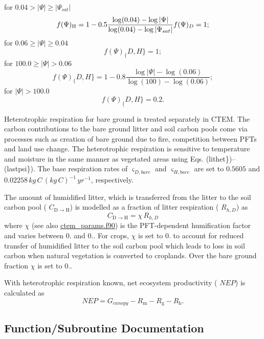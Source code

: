 for $0.04 > \vert\Psi\vert \geq \vert\Psi_{sat}\vert$ \[ f(\Psi)_\mathrm{H} = 1 - 0.5 \frac{\log(0.04)-\log\vert\Psi\vert}{\log(0.04)-\log\vert\Psi_{sat}\vert}\\ f(\Psi)_D = 1\nonumber; \] for $0.06 \geq \vert\Psi\vert \geq 0.04$ \[ f(\Psi)_\{D,H\} = 1; \] for $100.0 \geq \vert\Psi\vert > 0.06$ \[ f(\Psi)_\{D,H\} = 1 - 0.8\frac{\log\vert\Psi\vert-\log(0.06)}{\log(100)-\log(0.06)}; \] for $\vert\Psi\vert > 100.0$ \[ \label{lastpsi} f(\Psi)_\{D,H\}=0.2. \]

Heterotrophic respiration for bare ground is treated separately in C\+T\+E\+M. The carbon contributions to the bare ground litter and soil carbon pools come via processes such as creation of bare ground due to fire, competition between P\+F\+Ts and land use change. The heterotrophic respiration is sensitive to temperature and moisture in the same manner as vegetated areas using Eqs. (lithet\})--(lastpsi\}). The base respiration rates of $\varsigma_{D,bare}$ and $\varsigma_{H,bare}$ are set to $0.5605$ and $0.02258\,kg\,C\,(kg\,C)^{-1}\,yr^{-1}$, respectively.

The amount of humidified litter, which is transferred from the litter to the soil carbon pool ( $C_{\mathrm{D} \rightarrow \mathrm{H}}$) is modelled as a fraction of litter respiration ( $R_{h,D}$) as \[ \label{cdtoh} C_{\mathrm{D} \rightarrow \mathrm{H}} = \chi\,R_{h,D} \] where $\chi$ (see also \hyperlink{ctem__params_8f90}{ctem\+\_\+params.\+f90}) is the P\+F\+T-\/dependent humification factor and varies between 0. and 0.. For crops, $\chi$ is set to 0. to account for reduced transfer of humidified litter to the soil carbon pool which leads to loss in soil carbon when natural vegetation is converted to croplands. Over the bare ground fraction $\chi$ is set to 0..

With heterotrophic respiration known, net ecosystem productivity ( $NEP$) is calculated as \[ NEP = G_{canopy} - R_\mathrm{m} - R_\mathrm{g} - R_\mathrm{h}. \] 

\subsection{Function/\+Subroutine Documentation}
\hypertarget{hetresg__old_8f_abc05c909fea03987862d6cf0dd3c5a0c}{}
